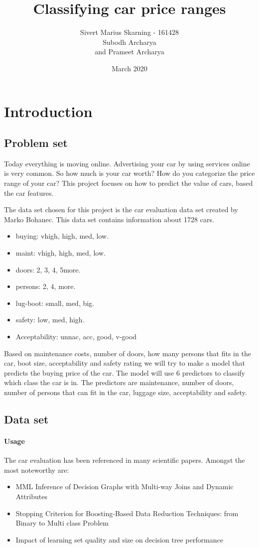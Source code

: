 \documentclass[a4paper, 12pt]{article}
\title{Classifying car price ranges}
\author{Sivert Marius Skarning - 161428\\Subodh Archarya\\and Prameet Archarya}
\date{March 2020}
\begin{document}
\maketitle
\clearpage
\tableofcontents
\clearpage

\section{Introduction}
\subsection{Problem set}
Today everything is moving online. Advertising your car by using services online is very common. So how much is your car worth? How do you categorize the price range of your car? This project focuses on how to predict the value of cars, based the car features.

The data set chosen for this project is the car evaluation data set created by Marko Bohanec. This data set contains information about 1728 cars.

\begin{itemize}
  \item buying: vhigh, high, med, low.
  \item maint: vhigh, high, med, low.
  \item doors: 2, 3, 4, 5more.
  \item persons: 2, 4, more.
  \item lug-boot: small, med, big.
  \item safety: low, med, high.
  \item Acceptability: unnac, acc, good, v-good
\end{itemize}

Based on maintenance costs, number of doors, how many persons that fits in the car, boot size, acceptability and safety rating we will try to make a model that predicts the buying price of the car. The model will use 6 predictors to classify which class the car is in. The predictors are maintenance, number of doors, number of persons that can fit in the car, luggage size, acceptability and safety.


\subsection{Data set}
\paragraph{Usage}
The car evaluation has been referenced in many scientific papers. Amongst the most noteworthy are:
\begin{itemize}
\item MML Inference of Decision Graphs with Multi-way Joins and Dynamic Attributes \cite{mml-interference}
\item Stopping Criterion for Boosting-Based Data Reduction Techniques: from Binary to Multi class Problem \cite{boosting}
\item Impact of learning set quality and size on decision tree performance \cite{learning-set}
\end{itemize}
\end{document}
